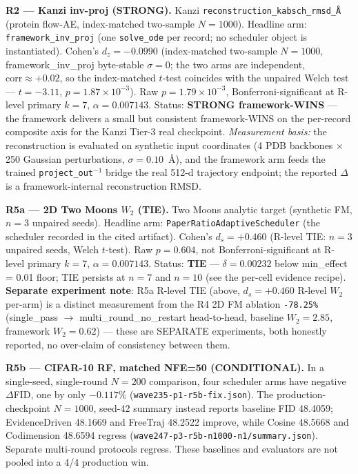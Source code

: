 \documentclass[journal,twocolumn,final]{IEEEtran}
\begin{document}
\textbf{R2 --- Kanzi inv-proj (STRONG).} Kanzi \texttt{reconstruction\_kabsch\_rmsd\_Å} (protein flow-AE, index-matched two-sample $N = 1000$). Headline arm: \texttt{framework\_inv\_proj} (one \texttt{solve\_ode} per record; no scheduler object is instantiated). Cohen's $d_z = -0.0990$ (index-matched two-sample $N = 1000$, framework\_inv\_proj byte-stable $\sigma = 0$; the two arms are independent, $\mathrm{corr} \approx +0.02$, so the index-matched $t$-test coincides with the unpaired Welch test --- $t = -3.11$, $p = 1.87 \times 10^{-3}$). Raw $p = 1.79 \times 10^{-3}$, Bonferroni-significant at R-level primary $k = 7$, $\alpha = 0.007143$. Status: \textbf{STRONG framework-WINS} --- the framework delivers a small but consistent framework-WINS on the per-record composite axis for the Kanzi Tier-3 real checkpoint. \emph{Measurement basis:} the reconstruction is evaluated on synthetic input coordinates (4 PDB backbones $\times$ 250 Gaussian perturbations, $\sigma = 0.10$~\AA{}), and the framework arm feeds the trained \texttt{project\_out}$^{-1}$ bridge the real 512-d trajectory endpoint; the reported $\Delta$ is a framework-internal reconstruction RMSD.

\textbf{R5a --- 2D Two Moons $W_2$ (TIE).} Two Moons analytic target (synthetic FM, $n = 3$ unpaired seeds). Headline arm: \texttt{PaperRatioAdaptiveScheduler} (the scheduler recorded in the cited artifact). Cohen's $d_s = +0.460$ (R-level TIE: $n = 3$ unpaired seeds, Welch $t$-test). Raw $p = 0.604$, not Bonferroni-significant at R-level primary $k = 7$, $\alpha = 0.007143$. Status: \textbf{TIE} --- $\delta = 0.00232$ below min\_effect = 0.01 floor; TIE persists at $n = 7$ and $n = 10$ (see the per-cell evidence recipe). \textbf{Separate experiment note}: R5a R-level TIE (above, $d_s = +0.460$ R-level $W_2$ per-arm) is a distinct measurement from the R4 2D FM ablation \texttt{-78.25\%} (single\_pass $\rightarrow$ multi\_round\_no\_restart head-to-head, baseline $W_2 = 2.85$, framework $W_2 = 0.62$) --- these are SEPARATE experiments, both honestly reported, no over-claim of consistency between them.

\textbf{R5b --- CIFAR-10 RF, matched NFE=50 (CONDITIONAL).} In a single-seed, single-round $N=200$ comparison, four scheduler arms have negative $\Delta$FID, one by only $-0.117\%$ (\texttt{wave235-p1-r5b-fix.json}). The production-checkpoint $N=1000$, seed-42 summary instead reports baseline FID 48.4059; EvidenceDriven 48.1669 and FreeTraj 48.2522 improve, while Cosine 48.5668 and Codimension 48.6594 regress (\texttt{wave247-p3-r5b-n1000-n1/summary.json}). Separate multi-round protocols regress. These baselines and evaluators are not pooled into a 4/4 production win.
\end{document}
